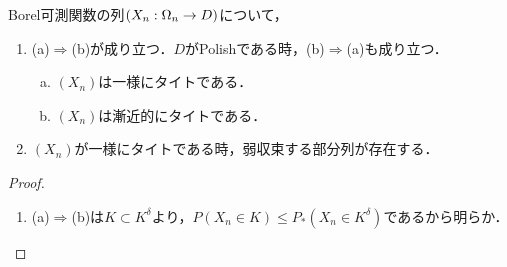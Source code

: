 \documentclass[uplatex,dvipdfmx]{jsreport}
\begin{document}
\begin{lemma}
    Borel可測関数の列$(X_n:\Omega_n\to D)$について，
    \begin{enumerate}
        \item (a)$\Rightarrow$(b)が成り立つ．$D$がPolishである時，(b)$\Rightarrow$(a)も成り立つ．
        \begin{enumerate}[(a)]
            \item $(X_n)$は一様にタイトである．
            \item $(X_n)$は漸近的にタイトである．
        \end{enumerate}
        \item $(X_n)$が一様にタイトである時，弱収束する部分列が存在する．
    \end{enumerate}
\end{lemma}
\begin{proof}\mbox{}
    \begin{enumerate}
        \item (a)$\Rightarrow$(b)は$K\subset K^\delta$より，$P(X_n\in K)\le P_*(X_n\in K^\delta)$であるから明らか．
    \end{enumerate}
\end{proof}
\end{document}
